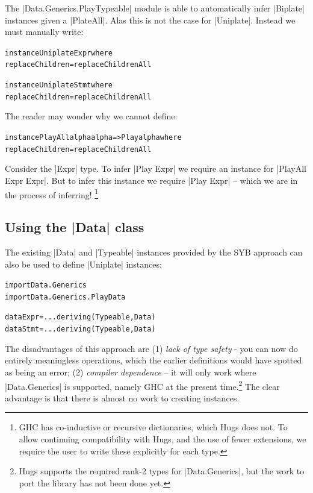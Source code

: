 \documentclass[preprint]{sigplanconf}
\newenvironment{code}{\begin{alltt}\small}{\end{alltt}}
\begin{document}
The |Data.Generics.PlayTypeable| module is able to automatically infer |Biplate| instances given a |PlateAll|. Alas this is not the case for |Uniplate|. Instead we must manually write:

\begin{code}
instance Uniplate Expr where
    replaceChildren = replaceChildrenAll

instance Uniplate Stmt where
    replaceChildren = replaceChildrenAll
\end{code}

The reader may wonder why we cannot define:

\begin{code}
instance PlayAll alpha alpha => Play alpha where
    replaceChildren = replaceChildrenAll
\end{code}

Consider the |Expr| type. To infer |Play Expr| we require an instance for |PlayAll Expr Expr|. But to infer this instance we require |Play Expr| -- which we are in the process of inferring! \footnote{GHC has co-inductive or recursive dictionaries, which Hugs does not. To allow continuing compatibility with Hugs, and the use of fewer extensions, we require the user to write these explicitly for each type.}


\subsection{Using the |Data| class}
\label{sec:implement_playdata}

The existing |Data| and |Typeable| instances provided by the SYB approach can also be used to define |Uniplate| instances:

\begin{code}
import Data.Generics
import Data.Generics.PlayData

data Expr  = ... \? \? deriving (Typeable, Data)
data Stmt  = ... \? \? deriving (Typeable, Data)
\end{code}

The disadvantages of this approach are (1) \textit{lack of type safety} - you can now do entirely meaningless operations, which the earlier definitions would have spotted as being an error; (2) \textit{compiler dependence} -- it will only work where |Data.Generics| is supported, namely GHC at the present time.\footnote{Hugs supports the required rank-2 types for |Data.Generics|, but the work to port the library has not been done yet.} The clear advantage is that there is almost no work to creating instances.
\end{document}

